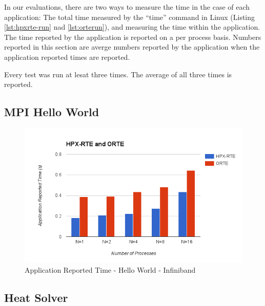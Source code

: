 In our evaluations, there are two ways to measure the time in the case of each application: The total time measured by the ``time'' command in Linux (Listing \ref{lst:hpxrte-run} nad \ref{lst:orterun}), and measuring the time within the application. The time reported by the application is reported on a per process basis. Numbers reported in this section are averge numbers reported by the application when the application reported times are reported.

Every test was run at lesat three times. The average of all three times is reported.

\subsection{MPI Hello World}

\begin{figure}[h!]
\centering
\includegraphics[scale=0.7]{images/time-app-hello-world-infiniband.png}
\caption[Application Reported Time - Hello World - Infiniband]{Application Reported Time - Hello World - Infiniband}
\label{fig:time-app-hello-world-infiniband}
\end{figure}


\subsection{Heat Solver}
~\cite{resch1999comparison}

